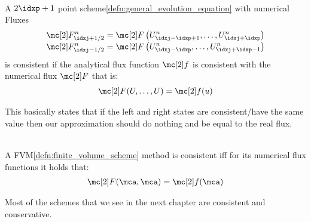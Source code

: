 \begin{defnbox}\nospacing
    \begin{defn}\label{defn:consistent_schemes}\leavevmode\\
        A $2\idxp+1$ point scheme\cref{defn:general_evolution_equation} with numerical Fluxes
        \begin{align}
          \Flux_{\idxj+1/2}^{n}&=\Flux \left(U_{\idxj-\idxp+1}^{n},\ldots,U_{\idxj+\idxp}^{n}\right)\\[-1\jot]
          \Flux_{\idxj-1/2}^{n}&=\Flux \left(U_{\idxj-\idxp}^{n},\ldots,U_{\idxj+\idxp-1}^{n}\right)
        \end{align}
        is consistent if the analytical flux function $\flux$ is consistent with the numerical flux $\Flux$ that is:
        \begin{align}
          \Flux(U,\ldots,U)=\flux(u)\label{eq:consistent_schemes}
        \end{align}
    \end{defn}
\end{defnbox}
\begin{explanationbox}\nospacing
    \begin{explanation}
        This basically states that if the left and right states are consistent/have the same value then
        our approximation should do nothing and be equal to the real flux.
    \end{explanation}
\end{explanationbox}
\begin{corbox}\nospacing
    \begin{cor}\label{cor:consitency_for_fvm}\leavevmode\\
        A FVM\cref{defn:finite_volume_scheme} method is consistent iff for its numerical flux functions it holds that:
        \begin{align}
          \Flux(\mca,\mca)=\flux(\mca)
        \end{align}
    \end{cor}
\end{corbox}
\begin{notebox}[Note]\nospacing
    Most of the schemes that we see in the next chapter are consistent and conservative.
\end{notebox}
